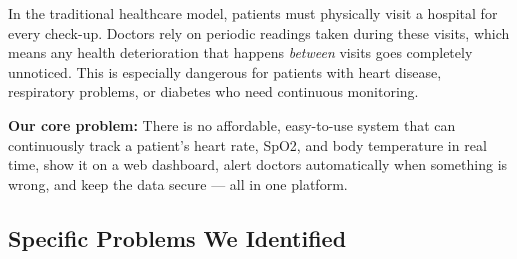 \documentclass[12pt,a4paper]{article}
\begin{document}
In the traditional healthcare model, patients must physically visit a hospital for every check-up. Doctors rely on periodic readings taken during these visits, which means any health deterioration that happens \textit{between} visits goes completely unnoticed. This is especially dangerous for patients with heart disease, respiratory problems, or diabetes who need continuous monitoring.

\vspace{0.2cm}
\noindent \textbf{Our core problem:} There is no affordable, easy-to-use system that can continuously track a patient's heart rate, SpO2, and body temperature in real time, show it on a web dashboard, alert doctors automatically when something is wrong, and keep the data secure --- all in one platform.

\subsection{Specific Problems We Identified}
\end{document}
